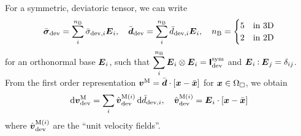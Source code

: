 \documentclass[10pt,a4paper]{article}
\begin{document}
For a symmetric, deviatoric tensor, we can write
\begin{align}
 \bar{\boldsymbol{\sigma}}_{\mathrm{dev}} = \sum_i^{n_{\mathrm{B}}} \bar{\sigma}_{\mathrm{dev},i} \boldsymbol{E}_i,\quad \bar{\boldsymbol{d}}_{\mathrm{dev}} = \sum_i^{n_{\mathrm{B}}} \bar{d}_{\mathrm{dev},i} \boldsymbol{E}_i,\quad n_{\mathrm{B}} = \begin{cases} 5 & \text{in 3D}\\ 2 & \text{in 2D}\end{cases}
\end{align}
for an orthonormal base $\boldsymbol{E}_i$, such that $\displaystyle \sum_i^{n_{\mathrm{B}}} \boldsymbol{E}_i \mathbin{\otimes} \boldsymbol{E}_i = \boldsymbol{\mathsf{I}}_{\mathrm{dev}}^{\mathrm{sym}}$ and $\boldsymbol{E}_i \mathbin{\vcentcolon} \boldsymbol{E}_j = \delta_{ij} $. 
From the first order representation $\boldsymbol{v}^{\mathrm{M}} = \bar{\boldsymbol{d}}\cdot[\boldsymbol{x}-\bar{\boldsymbol{x}}]$ for $\boldsymbol{x}\in\Omega_\Box$, we obtain %
\begin{equation}
  \operatorname{d \!} \boldsymbol{v}^{\mathrm{M}}_{\mathrm{dev}} =
    \sum_{i} \hat{\boldsymbol{v}}^{\mathrm{M}(i)}_{\mathrm{dev}} \operatorname{d \!}\bar{d}_{\mathrm{dev},i}, \quad  \hat{\boldsymbol{v}}^{\mathrm{M}(i)}_{\mathrm{dev}} = \boldsymbol{E}_i \cdot [\boldsymbol{x} - \bar{\boldsymbol{x}}]
    \label{eq216}
\end{equation}
where $\hat{\boldsymbol{v}}^{\mathrm{M}(i)}_{\mathrm{dev}}$ are the ``unit velocity fields''. 
\end{document}
